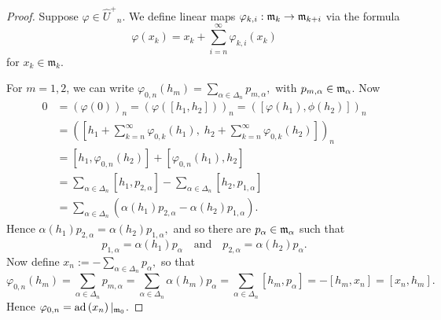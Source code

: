 \documentclass[11pt,letterpaper]{amsart}
\numberwithin{thecounter}{section}
\theoremstyle{definition}
\DeclareMathOperator{\ad}{ad}
\renewcommand{\a}{\alpha}
\newcommand{\Uhp}{{\widehat{U}^+}}
\newcommand{\m}{{\mathfrak{m}}}
\begin{document}
\begin{longver}
\begin{proof}
Suppose $\varphi\in\Uhp_n$. We define linear maps $ \varphi_{k,i}:{\frak m}_{k}\to{\frak m}_{k+i}$ via the formula
$$\varphi\left(x_k \right) = x_k + \sum_{i=n}^\infty \varphi_{k,i}\left(x_k \right)$$
for $x_k\in\m_k$.

For $m=1,2$, we can write
$ \varphi_{0,n}\left(h_m \right)= \sum_{\a\in\Delta_n} p_{m,\a},$ with $p_{m,\a}\in{\frak m}_\a$.
Now
\begin{align*}
0&=\left(\varphi(0)\right)_n= \left(\varphi\left(\left[h_1,h_2 \right] \right)\right)_n 
  = \left(\left[\varphi\left(h_1 \right),\phi\left(h_2 \right)\right]\right)_n\\
&= \left(\left[ h_1 + \sum_{k=n}^\infty \varphi_{0,k}\left(h_1 \right),\; h_2+ \sum_{k=n}^\infty \varphi_{0,k}\left(h_2 \right)\right]\right)_n\\
&= \left[ h_1, \varphi_{0,n}\left(h_2 \right)\right] + \left[ \varphi_{0,n}\left(h_1 \right),h_2\right] \\
&=
\sum_{\a\in\Delta_n} \left[h_1,p_{2,\a} \right] -
\sum_{\a\in\Delta_n} \left[h_2,p_{1,\a} \right]\\
 &=
\sum_{\a\in\Delta_n}  \left(\a\left(h_1 \right)p_{2,\a}- \a\left(h_2 \right)p_{1,\a}\right).
\end{align*}
Hence
$\a(h_1) p_{2,\a}=\a(h_2) p_{1,\a},$
and so there are $p_{\a}\in\frak m_\a$ such that
$$p_{1,\a}=\a\left(h_1\right)p_{\a} \quad\text{and}\quad p_{2,\a}=\a\left(h_2\right)p_{\a}.$$
Now define 
$ x_n := -\sum_{\a\in\Delta_n} p_\a,$
so that 
$$ \varphi_{0,n}\left(h_m\right)=\sum_{\a\in\Delta_n} p_{m,\a} =\sum_{\a\in\Delta_n} \a\left(h_m\right)p_{\a}=\sum_{\a\in\Delta_n} \left[h_m,p_{\a}\right]
 =-\left[h_m,x_n\right]=\left[x_n,h_m\right].$$
Hence $ \varphi_{0,n}=\ad\left(x_n\right)|_{{\frak m}_0}$.


\end{proof}
\end{longver}
\end{document}
